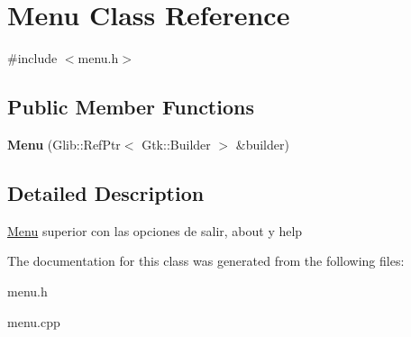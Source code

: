 \hypertarget{classMenu}{\section{Menu Class Reference}
\label{classMenu}
}


{\ttfamily \#include $<$menu.\-h$>$}

\subsection*{Public Member Functions}
\begin{DoxyCompactItemize}
\item 
\hypertarget{classMenu_a251f653c4eec0db5f8b44a3f2ac79484}{{\bfseries Menu} (Glib\-::\-Ref\-Ptr$<$ Gtk\-::\-Builder $>$ \&builder)}\label{classMenu_a251f653c4eec0db5f8b44a3f2ac79484}

\end{DoxyCompactItemize}


\subsection{Detailed Description}
\hyperlink{classMenu}{Menu} superior con las opciones de salir, about y help 

The documentation for this class was generated from the following files\-:\begin{DoxyCompactItemize}
\item 
menu.\-h\item 
menu.\-cpp\end{DoxyCompactItemize}
